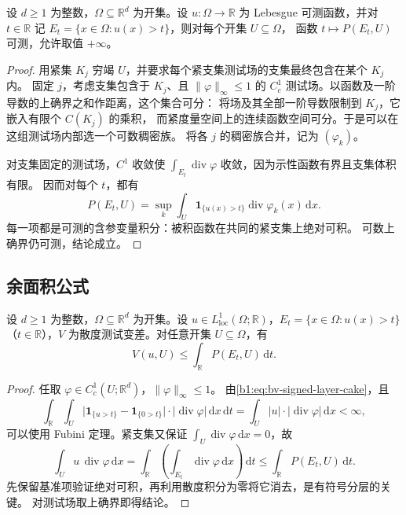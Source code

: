 \begin{lemma}[层集周长的可测性]\label{b1:lem:level-perimeter-measurable}
设 \(d\ge1\) 为整数，\(\Omega\subseteq\mathbb R^d\) 为开集。设 \(u:\Omega\to\mathbb R\) 为 Lebesgue 可测函数，并对 \(t\in\mathbb R\) 记 \(E_t=\{x\in\Omega:u(x)>t\}\)，则对每个开集 \(U\subseteq\Omega\)，
函数 \(t\mapsto P(E_t,U)\) 可测，允许取值 \(+\infty\)。
\end{lemma}
\begin{proof}
用紧集 \(K_j\) 穷竭 \(U\)，并要求每个紧支集测试场的支集最终包含在某个 \(K_j\) 内。
固定 \(j\)，考虑支集包含于 \(K_j\)、且 \(\|\varphi\|_\infty\le1\) 的
\(C_c^1\) 测试场。以函数及一阶导数的上确界之和作距离，这个集合可分：
将场及其全部一阶导数限制到 \(K_j\)，它嵌入有限个 \(C(K_j)\) 的乘积，
而紧度量空间上的连续函数空间可分。于是可以在这组测试场内部选一个可数稠密族。
将各 \(j\) 的稠密族合并，记为 \((\varphi_k)\)。

对支集固定的测试场，\(C^1\) 收敛使
\(\int_{E_t}\operatorname{div}\varphi\) 收敛，因为示性函数有界且支集体积有限。
因而对每个 \(t\)，都有
\[
 P(E_t,U)=\sup_k\int_U\mathbf1_{\{u(x)>t\}}
                         \operatorname{div}\varphi_k(x)\,\mathrm dx.
\]
每一项都是可测的含参变量积分：被积函数在共同的紧支集上绝对可积。
可数上确界仍可测，结论成立。
\end{proof}

\subsection{余面积公式}
\label{b1:subsec:270303}

\begin{lemma}[层集积分对变差的控制]\label{b1:lem:layer-perimeter-controls-variation}
设 \(d\ge1\) 为整数，\(\Omega\subseteq\mathbb R^d\) 为开集。设 \(u\in L^1_{\mathrm{loc}}(\Omega;\mathbb R)\)，\(E_t=\{x\in\Omega:u(x)>t\}\)（\(t\in\mathbb R\)），\(V\) 为散度测试变差。对任意开集 \(U\subseteq\Omega\)，有
\[
 V(u,U)\le\int_{\mathbb R}P(E_t,U)\,\mathrm dt.
\]
\end{lemma}
\begin{proof}
任取 \(\varphi\in C_c^1(U;\mathbb R^d)\)，\(\|\varphi\|_\infty\le1\)。
由\eqref{b1:eq:bv-signed-layer-cake}，且
\[
 \int_{\mathbb R}\int_U
 \bigl|\mathbf1_{\{u>t\}}-\mathbf1_{\{0>t\}}\bigr|
                 \cdot|\operatorname{div}\varphi|\,\mathrm dx\,\mathrm dt
 =\int_U|u|\cdot|\operatorname{div}\varphi|\,\mathrm dx<\infty,
\]
可以使用 Fubini 定理。紧支集又保证
\(\int_U\operatorname{div}\varphi\,\mathrm dx=0\)，故
\[
 \int_Uu\,\operatorname{div}\varphi\,\mathrm dx
 =\int_{\mathbb R}\left(\int_{E_t}\operatorname{div}\varphi\,\mathrm dx\right)\,\mathrm dt
 \le\int_{\mathbb R}P(E_t,U)\,\mathrm dt.
\]
先保留基准项验证绝对可积，再利用散度积分为零将它消去，是有符号分层的关键。
对测试场取上确界即得结论。
\end{proof}


